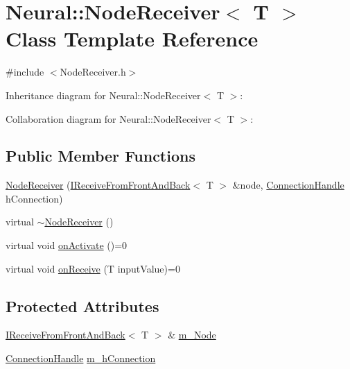 \hypertarget{class_neural_1_1_node_receiver}{
\section{Neural::NodeReceiver$<$ T $>$ Class Template Reference}
\label{class_neural_1_1_node_receiver}
}


{\ttfamily \#include $<$NodeReceiver.h$>$}



Inheritance diagram for Neural::NodeReceiver$<$ T $>$:


Collaboration diagram for Neural::NodeReceiver$<$ T $>$:
\subsection*{Public Member Functions}
\begin{DoxyCompactItemize}
\item 
\hyperlink{class_neural_1_1_node_receiver_a508e8c7ddacc752897c59d670bd2c736}{NodeReceiver} (\hyperlink{class_neural_1_1_i_receive_from_front_and_back}{IReceiveFromFrontAndBack}$<$ T $>$ \&node, \hyperlink{namespace_neural_a73b2763d14999ad4308dbf4246aa503f}{ConnectionHandle} hConnection)
\item 
virtual \hyperlink{class_neural_1_1_node_receiver_af1fe056fec9486681c7045f07e757b13}{$\sim$NodeReceiver} ()
\item 
virtual void \hyperlink{class_neural_1_1_node_receiver_a759e123507a96915d7cf7f4040d07fb8}{onActivate} ()=0
\item 
virtual void \hyperlink{class_neural_1_1_node_receiver_a3775af35d7b619c799e377bacf29f0d7}{onReceive} (T inputValue)=0
\end{DoxyCompactItemize}
\subsection*{Protected Attributes}
\begin{DoxyCompactItemize}
\item 
\hyperlink{class_neural_1_1_i_receive_from_front_and_back}{IReceiveFromFrontAndBack}$<$ T $>$ \& \hyperlink{class_neural_1_1_node_receiver_aca3afc7c5d6c1b378a95f24a42926586}{m\_\-Node}
\item 
\hyperlink{namespace_neural_a73b2763d14999ad4308dbf4246aa503f}{ConnectionHandle} \hyperlink{class_neural_1_1_node_receiver_ad02dfaa1d4d9ba2e2bdef03a4b310282}{m\_\-hConnection}
\end{DoxyCompactItemize}


